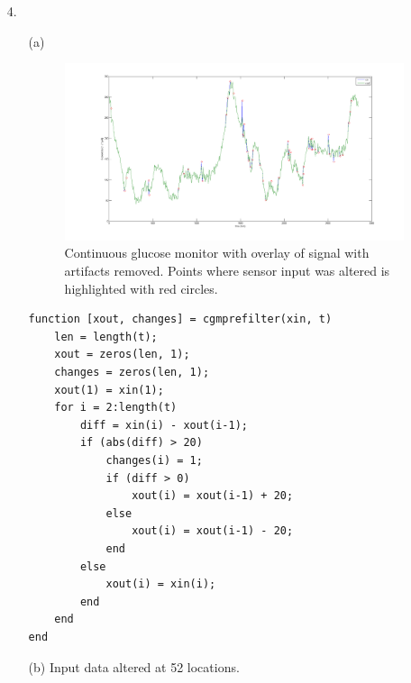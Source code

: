 \documentclass{article}
\begin{document}
\begin{enumerate}
\item[4.]
	\begin{enumerate}
	\item[(a)] $\:$ \\
		\begin{figure}[!htb]
		\minipage{\textwidth}
		  \includegraphics[width=\linewidth]{../images/Problem4Graph.png}
		  \caption{Continuous glucose monitor with overlay of signal with artifacts removed. Points where sensor input was altered is highlighted with red circles.}
		\endminipage\hfill
		\end{figure}

\bigskip 

\begin{lstlisting}   
function [xout, changes] = cgmprefilter(xin, t)
    len = length(t);
    xout = zeros(len, 1);
    changes = zeros(len, 1);
    xout(1) = xin(1);
    for i = 2:length(t)
        diff = xin(i) - xout(i-1);
        if (abs(diff) > 20)
            changes(i) = 1;
            if (diff > 0)
                xout(i) = xout(i-1) + 20;
            else
                xout(i) = xout(i-1) - 20;
            end
        else
            xout(i) = xin(i);
        end
    end
end
\end{lstlisting}

\bigskip 

	\item[(b)]
	Input data altered at 52 locations.
	\end{enumerate}

\end{enumerate}
\end{document}

